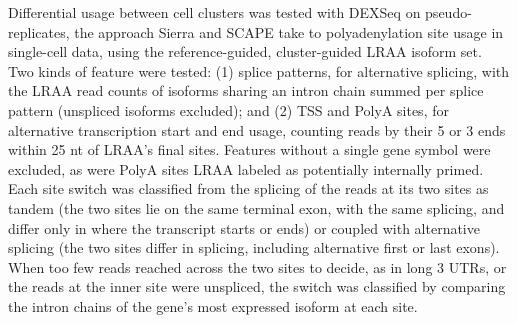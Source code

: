Differential usage between cell clusters was tested with DEXSeq \citep{anders2012} on pseudo-replicates, the approach Sierra \citep{patrick2020} and SCAPE \citep{zhou2022} take to polyadenylation site usage in single-cell data, using the reference-guided, cluster-guided LRAA isoform set. Two kinds of feature were tested: (1) splice patterns, for alternative splicing, with the LRAA read counts of isoforms sharing an intron chain summed per splice pattern (unspliced isoforms excluded); and (2) TSS and PolyA sites, for alternative transcription start and end usage, counting reads by their 5\p{} or 3\p{} ends within 25 nt of LRAA's final sites. Features without a single gene symbol were excluded, as were PolyA sites LRAA labeled as potentially internally primed. Each site switch was classified from the splicing of the reads at its two sites as tandem (the two sites lie on the same terminal exon, with the same splicing, and differ only in where the transcript starts or ends) or coupled with alternative splicing (the two sites differ in splicing, including alternative first or last exons). When too few reads reached across the two sites to decide, as in long 3\p{} UTRs, or the reads at the inner site were unspliced, the switch was classified by comparing the intron chains of the gene's most expressed isoform at each site.

